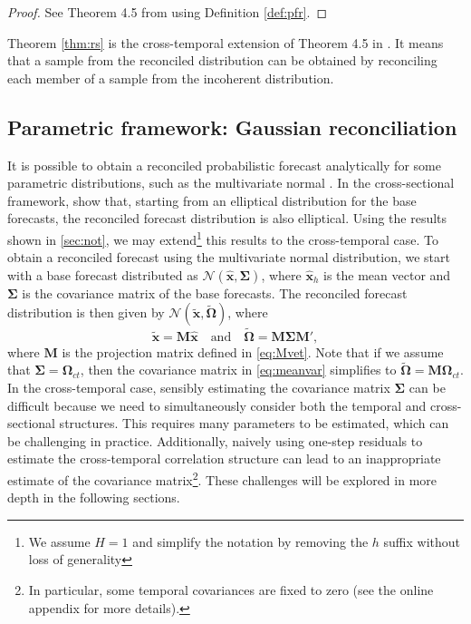 \documentclass[12pt]{article}
\newcommand{\xvet}{\bm{x}}
\newcommand{\Mvet}{\bm{M}}
\newcommand{\Omegavet}{\bm{\Omega}}
\newcommand{\Sigmavet}{\bm{\Sigma}}
\theoremstyle{definition}
\begin{document}
\begin{proof}
	See Theorem 4.5 from \cite{panagiotelis2023} using Definition \ref{def:pfr}.
\end{proof}
Theorem \ref{thm:rs} is the cross-temporal extension of Theorem 4.5 in \cite{panagiotelis2023}. It means that a sample from the reconciled distribution can be obtained by reconciling each member of a sample from the incoherent distribution.

\subsection{Parametric framework: Gaussian reconciliation}\label{ssec:prob_pf}

It is possible to obtain a reconciled probabilistic forecast analytically for some parametric distributions, such as the multivariate normal \citep{corani2021, eckert2021, panagiotelis2023, wickramasuriya2021b}. In the cross-sectional framework, \cite{panagiotelis2023} show that, starting from an elliptical distribution for the base forecasts, the reconciled forecast distribution is also elliptical. Using the results shown in \autoref{sec:not}, we may extend\footnote{We assume $H =1$ and simplify the notation by removing the $h$ suffix without loss of generality} this results to the cross-temporal case. To obtain a reconciled forecast using the multivariate normal distribution, we start with a base forecast distributed as $\mathcal{N}(\widehat{\xvet}, \Sigmavet)$, where $\widehat{\xvet}_h$ is the mean vector and $\Sigmavet$ is the covariance matrix of the base forecasts. The reconciled forecast distribution is then given by $\mathcal{N}(\widetilde{\xvet}, \widetilde{\Omegavet})$, where
\begin{equation}\label{eq:meanvar}
	\widetilde{\xvet} = \Mvet\widehat{\xvet} \quad \mbox{and} \quad \widetilde{\Omegavet} = \Mvet \Sigmavet \Mvet',
\end{equation}
where $\Mvet$ is the projection matrix defined in \eqref{eq:Mvet}.
Note that if we assume that $\Sigmavet = \Omegavet_{ct}$, then the covariance matrix in \eqref{eq:meanvar} simplifies to $\widetilde{\Omegavet} = \Mvet \Omegavet_{ct}$. In the cross-temporal case, sensibly estimating the covariance matrix $\Sigmavet$ can be difficult because we need to simultaneously consider both the temporal and cross-sectional structures. This requires many parameters to be estimated, which can be challenging in practice. Additionally, naively using one-step residuals to estimate the cross-temporal correlation structure can lead to an inappropriate estimate of the covariance matrix\footnote{In particular, some temporal covariances are fixed to zero (see the online appendix for more details).}. These challenges will be explored in more depth in the following sections.
\end{document}
